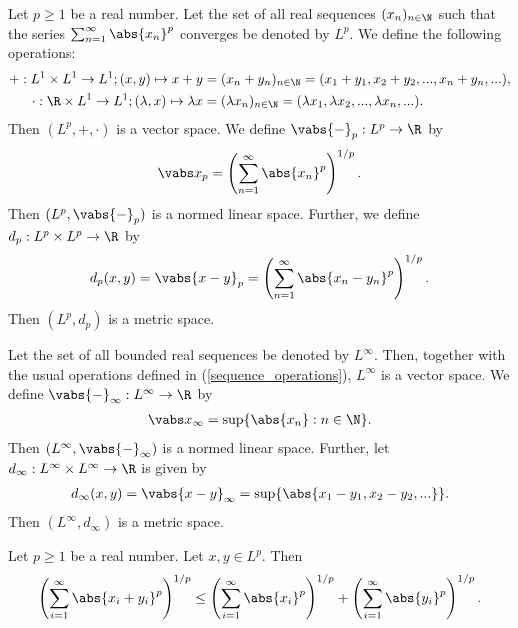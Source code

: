 \documentclass{article}
\begin{document}
\begin{lemma}
    Let $p\geq 1$ be a real number.
    Let the set of all real sequences $(x_n)_{n\in\N}$ such that the series
    $\sum_{n=1}^\infty \abs{x_n}^p$ converges be denoted by $L^p$.
    We define the following operations:
    \begin{align}
        \label{sequence_operations}
        +:L^1\times L^1\to L^1;(x,y)\mapsto x+y               & =(x_n+y_n)_{n\in\N}=(x_1+y_1,x_2+y_2,...,x_n+y_n,...),                 \\
        \cdot:\R\times L^1\to L^1;(\lambda,x)\mapsto\lambda x & =(\lambda x_n)_{n\in\N}=(\lambda x_1,\lambda x_2,...,\lambda x_n,...).
    \end{align}
    Then $(L^p,+,\cdot)$ is a vector space.
    We define $\vabs{-}_p:L^p\to\R$ by
    \begin{align*}
        \vabs x_p = \left(\sum_{n=1}^\infty \abs{x_n}^p\right)^{1/p}.
    \end{align*}
    Then $(L^p, \vabs{-}_p)$ is a normed linear space.
    Further, we define $d_p:L^p\times L^p\to\R$ by
    \begin{align*}
        d_p(x,y)=\vabs{x-y}_p=\left(\sum_{n=1}^\infty\abs{x_n-y_n}^p\right)^{1/p}.
    \end{align*}
    Then $(L^p,d_p)$ is a metric space.
\end{lemma}

\begin{lemma}
    Let the set of all bounded real sequences be denoted by $L^\infty$. Then, together with
    the usual operations defined in (\ref{sequence_operations}), $L^\infty$ is a vector space.
    We define $\vabs{-}_\infty:L^\infty\to\R$ by
    \begin{align*}
        \vabs x_\infty = \sup\{\abs{x_n}:n\in\N\}.
    \end{align*}
    Then $(L^\infty,\vabs{-}_\infty)$ is a normed linear space.
    Further, let $d_\infty:L^\infty\times L^\infty\to\R$ is given by
    \begin{align*}
        d_\infty(x,y)=\vabs{x-y}_\infty = \sup\{\abs{x_1-y_1,x_2-y_2,...}\}.
    \end{align*}
    Then $(L^\infty, d_\infty)$ is a metric space.
\end{lemma}

\begin{lemma}
    Let $p\geq 1$ be a real number. Let $x,y\in L^p$. Then
    \begin{align*}
        \left(\sum_{i=1}^\infty \abs{x_i+y_i}^p\right)^{1/p}
        \leq \left(\sum_{i=1}^\infty \abs{x_i}^p\right)^{1/p}
        + \left(\sum_{i=1}^\infty \abs{y_i}^p\right)^{1/p}.
    \end{align*}
\end{lemma}
\end{document}
